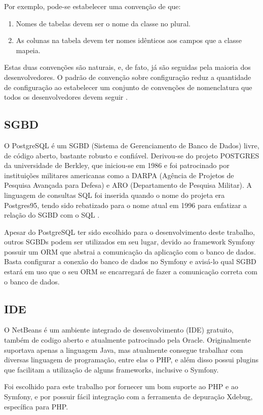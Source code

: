 Por exemplo, pode-se estabelecer uma convenção de que:
\begin{enumerate}
\item Nomes de tabelas devem ser o nome da classe no plural.
\item As colunas na tabela devem ter nomes idênticos aos campos que a classe mapeia.
\end{enumerate}

Estas duas convenções são naturais, e, de fato, já são seguidas pela maioria dos desenvolvedores.
O padrão de convenção sobre configuração reduz a quantidade de configuração ao estabelecer
um conjunto de convenções de nomenclatura que todos os desenvolvedores devem seguir \cite{Chen}.

\subsection{SGBD}
O PostgreSQL é um SGBD (Sistema de Gerenciamento de Banco de Dados) livre, de código aberto,
bastante robusto e confiável. Derivou-se do projeto POSTGRES da universidade de Berkley, que 
iniciou-se em 1986 e foi patrocinado por instituições militares americanas como a DARPA
 (Agência de Projetos de Pesquisa Avançada para Defesa) e ARO (Departamento de Pesquisa Militar).
A linguagem de consultas SQL foi inserida quando o nome do projeta era Postgres95, tendo sido
rebatizado para o nome atual em 1996 para enfatizar a relação do SGBD com o SQL \cite{postgresql}.

Apesar do PostgreSQL ter sido escolhido para o desenvolvimento deste trabalho, outros SGBDs
podem ser utilizados em seu lugar, devido ao framework Symfony possuir um ORM que abstrai
a comunicação da aplicação com o banco de dados. Basta configurar a conexão do banco de dados
no Symfony e avisá-lo qual SGBD estará em uso que o seu ORM se encarregará de fazer a comunicação
correta com o banco de dados.

\subsection{IDE}
O NetBeans é um ambiente integrado de desenvolvimento (IDE) gratuito, também de codigo aberto e 
atualmente patrocinado pela Oracle. Originalmente suportava apenas a linguagem Java, mas atualmente
consegue trabalhar com diversas linguagem de programação, entre elas o PHP, e além disso possui plugins
que facilitam a utilização de alguns frameworks, inclusive o Symfony.

Foi escolhido para este trabalho por fornecer um bom suporte ao PHP e ao Symfony, e por possuir fácil
integração com a ferramenta de depuração Xdebug, específica para PHP.

